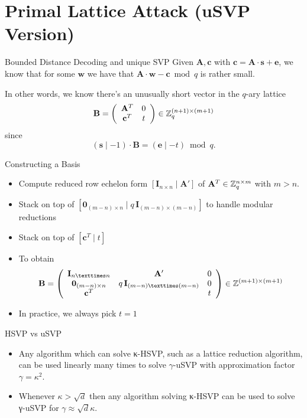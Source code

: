 \documentclass[presentation,smaller]{beamer}
\renewcommand{\vec}[1]{\mathbf{#1}\xspace}
\begin{document}
\section{Primal Lattice Attack (uSVP Version)}
\label{sec:org854e8a0}
\begin{frame}[label={sec:org892de37}]{Bounded Distance Decoding and unique SVP}
Given \(\vec{A}, \vec{c}\) with \(\vec{c} = \vec{A} ⋅ \vec{s} + \vec{e}\), we know that for some \(\vec{w}\) we have that \(\vec{A}⋅\vec{w} - \vec{c} \bmod q\) is rather small.

In other words, we know there’s an unusually short vector in the \(q\)-ary lattice \[\vec{B}=\left(\begin{array}{cc}
          \vec{A}^T &  0 \\
          \vec{c}^T   & t \\
        \end{array} \right) \in \ZZ_q^{(n+1) \times (m+1)}\] since \[(\vec{s} \mid -1) ⋅ \vec{B} = (\vec{e} \mid -t) \bmod q.\]
\end{frame}

\begin{frame}[label={sec:org13f7a3c}]{Constructing a Basis}
\begin{itemize}
\item Compute reduced row echelon form \([\vec{I}_{n × n} \mid \vec{A}']\) of \(\vec{A}^T \in \ZZ_q^{n \times m}\) with \(m>n\).
\item Stack on top of \([\vec{0}_{(m-n) \times n} \mid q\,\vec{I}_{(m-n) × (m-n)}]\) to handle modular reductions
\item Stack on top of \([\vec{c}^T \mid t]\)
\item To obtain \[\vec{B}=\left(\begin{array}{ccc}
         \vec{I}_{n × n} & \vec{A}' &  0 \\
         \vec{0}_{(m-n) \times n} & q\,\vec{I}_{(m-n) × (m-n)} & 0\\
          \vec{c}^T  & & t \\
        \end{array} \right) \in \ZZ^{(m+1) \times (m+1)}\]
\item In practice, we always pick \(t=1\)
\end{itemize}
\end{frame}

\begin{frame}[label={sec:org6afff79}]{HSVP vs uSVP}
\begin{itemize}
\item Any algorithm which can solve κ-HSVP, such as a lattice reduction algorithm, can be used linearly many times to solve \(γ\)-uSVP with approximation factor \(γ=κ^2\).
\item Whenever \(κ > \sqrt{d}\) then any algorithm solving κ-HSVP can be used to solve γ-uSVP for \(γ ≈ \sqrt{d} κ\).
\end{itemize}
\end{frame}
\end{document}
